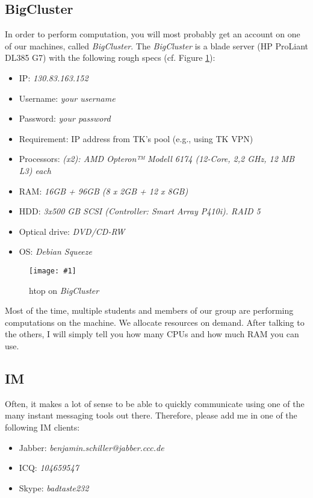\documentclass{article}
\newcommand{\img}[4]{
	\begin{figure}[!htb]
		\centering
		\texttt{[image: \#1]}
		\caption{#3}
		\label{#2}
	\end{figure}
}
\begin{document}
\subsection{BigCluster}

In order to perform computation, you will most probably get an account on one of our machines, called \emph{BigCluster}.
The \emph{BigCluster} is a blade server (HP ProLiant DL385 G7) with the following rough specs (cf. Figure \ref{fig:bigcluster}):

\begin{itemize}
	\item IP: \emph{130.83.163.152}
	\item Username: \emph{your username}
	\item Password: \emph{your password}
	\item Requirement: IP address from TK's pool (e.g., using TK VPN)
	\item Processors: \emph{(x2): AMD Opteron™ Modell 6174 (12-Core, 2,2 GHz, 12 MB L3) each}
	\item RAM: \emph{16GB + 96GB (8 x 2GB + 12 x 8GB)}
	\item HDD: \emph{3x500 GB SCSI (Controller: Smart Array P410i). RAID 5}
	\item Optical drive: \emph{DVD/CD-RW}
	\item OS: \emph{Debian Squeeze}
\end{itemize}

\img{bigcluster}{fig:bigcluster}{htop on \emph{BigCluster}}{0.5}

Most of the time, multiple students and members of our group are performing computations on the machine.
We allocate resources on demand.
After talking to the others, I will simply tell you how many CPUs and how much RAM you can use.







\subsection{IM}

Often, it makes a lot of sense to be able to quickly communicate using one of the many instant messaging tools out there.
Therefore, please add me in one of the following IM clients:
\begin{itemize}
	\item Jabber: \emph{benjamin.schiller@jabber.ccc.de}
	\item ICQ: \emph{104659547}
	\item Skype: \emph{badtaste232}
\end{itemize}
\end{document}
